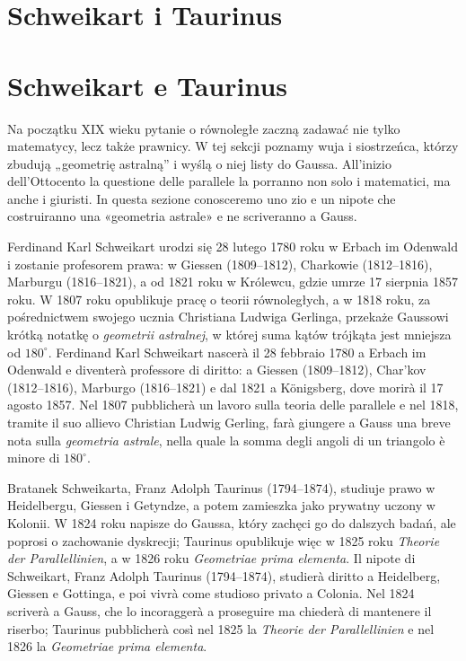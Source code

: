 
\section{Schweikart i Taurinus} %
\section{Schweikart e Taurinus} %
\label{sekcja_schweikart_taurinus}

Na początku XIX wieku pytanie o równoległe zaczną zadawać nie tylko matematycy, lecz także prawnicy. %
W tej sekcji poznamy wuja i siostrzeńca, którzy zbudują „geometrię astralną'' i wyślą o niej listy do Gaussa. %
All'inizio dell'Ottocento la questione delle parallele la porranno non solo i matematici, ma anche i giuristi. %
In questa sezione conosceremo uno zio e un nipote che costruiranno una «geometria astrale» e ne scriveranno a Gauss. %

Ferdinand Karl Schweikart urodzi się 28 lutego 1780 roku w Erbach im Odenwald i zostanie profesorem prawa: w Giessen (1809--1812), Charkowie (1812--1816), Marburgu (1816--1821), a od 1821 roku w Królewcu, gdzie umrze 17 sierpnia 1857 roku. %
W 1807 roku opublikuje pracę o teorii równoległych, a w 1818 roku, za pośrednictwem swojego ucznia Christiana Ludwiga Gerlinga, przekaże Gaussowi krótką notatkę o \emph{geometrii astralnej}, w której suma kątów trójkąta jest mniejsza od $180^\circ$. %
Ferdinand Karl Schweikart nascerà il 28 febbraio 1780 a Erbach im Odenwald e diventerà professore di diritto: a Giessen (1809--1812), Char'kov (1812--1816), Marburgo (1816--1821) e dal 1821 a Königsberg, dove morirà il 17 agosto 1857. %
Nel 1807 pubblicherà un lavoro sulla teoria delle parallele e nel 1818, tramite il suo allievo Christian Ludwig Gerling, farà giungere a Gauss una breve nota sulla \emph{geometria astrale}, nella quale la somma degli angoli di un triangolo è minore di $180^\circ$. %
%
%

Bratanek Schweikarta, Franz Adolph Taurinus (1794--1874), studiuje prawo w Heidelbergu, Giessen i Getyndze, a potem zamieszka jako prywatny uczony w Kolonii. %
W 1824 roku napisze do Gaussa, który zachęci go do dalszych badań, ale poprosi o zachowanie dyskrecji; Taurinus opublikuje więc w 1825 roku \emph{Theorie der Parallellinien}, a w 1826 roku \emph{Geometriae prima elementa}. %
Il nipote di Schweikart, Franz Adolph Taurinus (1794--1874), studierà diritto a Heidelberg, Giessen e Gottinga, e poi vivrà come studioso privato a Colonia. %
Nel 1824 scriverà a Gauss, che lo incoraggerà a proseguire ma chiederà di mantenere il riserbo; Taurinus pubblicherà così nel 1825 la \emph{Theorie der Parallellinien} e nel 1826 la \emph{Geometriae prima elementa}. %
%

